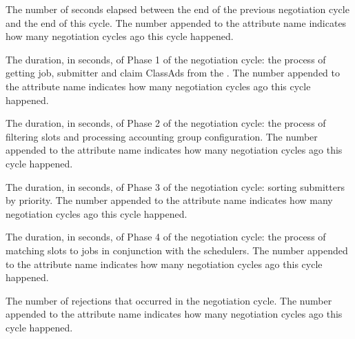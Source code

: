 \begin{description}
\label{attr:LastNegotiationCyclePeriod<X>}
\item[\AdAttr{LastNegotiationCyclePeriod<X>}:] 
The number of seconds elapsed between the end of the previous 
negotiation cycle and the end of this cycle.  
The number  appended to the attribute name indicates 
how many negotiation cycles ago this cycle happened.

\label{attr:LastNegotiationCyclePhase1Duration<X>}
\item[\AdAttr{LastNegotiationCyclePhase1Duration<X>}:] 
The duration, in seconds, of Phase 1 of the negotiation cycle: 
the process of getting job, submitter and claim ClassAds from the 
.
The number  appended to the attribute name indicates 
how many negotiation cycles ago this cycle happened.

\label{attr:LastNegotiationCyclePhase2Duration<X>}
\item[\AdAttr{LastNegotiationCyclePhase2Duration<X>}:] 
The duration, in seconds, of Phase 2 of the negotiation cycle: 
the process of filtering slots and processing accounting group configuration. 
The number  appended to the attribute name indicates 
how many negotiation cycles ago this cycle happened.

\label{attr:LastNegotiationCyclePhase3Duration<X>}
\item[\AdAttr{LastNegotiationCyclePhase3Duration<X>}:] 
The duration, in seconds, of Phase 3 of the negotiation cycle: 
sorting submitters by priority.  
The number  appended to the attribute name indicates 
how many negotiation cycles ago this cycle happened.

\label{attr:LastNegotiationCyclePhase4Duration<X>}
\item[\AdAttr{LastNegotiationCyclePhase4Duration<X>}:] 
The duration, in seconds, of Phase 4 of the negotiation cycle: 
the process of matching slots to jobs in conjunction with the schedulers. 
The number  appended to the attribute name indicates 
how many negotiation cycles ago this cycle happened.

\label{attr:LastNegotiationCycleRejections<X>}
\item[\AdAttr{LastNegotiationCycleRejections<X>}:] The number of
rejections that occurred in the negotiation cycle.  The number 
appended to the attribute name indicates how many negotiation cycles
ago this cycle happened.


\end{description}
